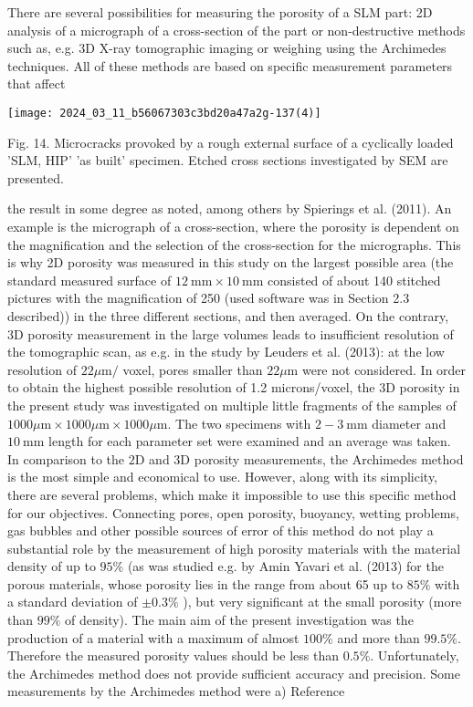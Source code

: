 \documentclass[10pt]{article}
\begin{document}
There are several possibilities for measuring the porosity of a SLM part: 2D analysis of a micrograph of a cross-section of the part or non-destructive methods such as, e.g. 3D X-ray tomographic imaging or weighing using the Archimedes techniques. All of these methods are based on specific measurement parameters that affect

\begin{center}
\texttt{[image: 2024\_03\_11\_b56067303c3bd20a47a2g-137(4)]}
\end{center}

Fig. 14. Microcracks provoked by a rough external surface of a cyclically loaded 'SLM, HIP' 'as built' specimen. Etched cross sections investigated by SEM are presented.

the result in some degree as noted, among others by Spierings et al. (2011). An example is the micrograph of a cross-section, where the porosity is dependent on the magnification and the selection of the cross-section for the micrographs. This is why 2D porosity was measured in this study on the largest possible area (the standard measured surface of $12 \mathrm{~mm} \times 10 \mathrm{~mm}$ consisted of about 140 stitched pictures with the magnification of 250 (used software was in Section 2.3 described)) in the three different sections, and then averaged. On the contrary, 3D porosity measurement in the large volumes leads to insufficient resolution of the tomographic scan, as e.g. in the study by Leuders et al. (2013): at the low resolution of $22 \mu \mathrm{m} /$ voxel, pores smaller than $22 \mu \mathrm{m}$ were not considered. In order to obtain the highest possible resolution of 1.2 microns/voxel, the $3 \mathrm{D}$ porosity in the present study was investigated on multiple little fragments of the samples of $1000 \mu \mathrm{m} \times 1000 \mu \mathrm{m} \times 1000 \mu \mathrm{m}$. The two specimens with $2-3 \mathrm{~mm}$ diameter and $10 \mathrm{~mm}$ length for each parameter set were examined and an average was taken.\\
In comparison to the $2 \mathrm{D}$ and $3 \mathrm{D}$ porosity measurements, the Archimedes method is the most simple and economical to use. However, along with its simplicity, there are several problems, which make it impossible to use this specific method for our objectives. Connecting pores, open porosity, buoyancy, wetting problems, gas bubbles and other possible sources of error of this method do not play a substantial role by the measurement of high porosity materials with the material density of up to $95 \%$ (as was studied e.g. by Amin Yavari et al. (2013) for the porous materials, whose porosity lies in the range from about 65 up to $85 \%$ with a standard deviation of $\pm 0.3 \%$ ), but very significant at the small porosity (more than $99 \%$ of density). The main aim of the present investigation was the production of a material with a maximum of almost $100 \%$ and more than $99.5 \%$. Therefore the measured porosity values should be less than $0.5 \%$. Unfortunately, the Archimedes method does not provide sufficient accuracy and precision. Some measurements by the Archimedes method were a) Reference
\end{document}
